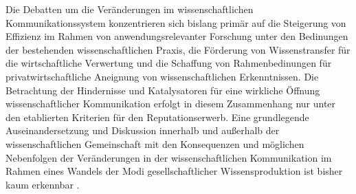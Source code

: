 Die Debatten um die Veränderungen im wissenschaftlichen Kommunikationssystem konzentrieren sich bislang primär auf die Steigerung von Effizienz im Rahmen von anwendungsrelevanter Forschung unter den Bedinungen der bestehenden wissenschaftlichen Praxis, die Förderung von Wissenstransfer für die wirtschaftliche Verwertung und die Schaffung von Rahmenbedinungen für privatwirtschaftliche Aneignung von wissenschaftlichen Erkenntnissen. Die Betrachtung der Hindernisse und Katalysatoren für eine wirkliche Öffnung wissenschaftlicher Kommunikation erfolgt in diesem Zusammenhang nur unter den etablierten Kriterien für den Reputationserwerb. Eine grundlegende Auseinandersetzung und Diskussion innerhalb und außerhalb der wissenschaftlichen Gemeinschaft mit den Konsequenzen und möglichen Nebenfolgen der Veränderungen in der wissenschaftlichen Kommunikation im Rahmen eines Wandels der Modi gesellschaftlicher Wissensproduktion ist bisher kaum erkennbar \cite{Buss_2001}.
